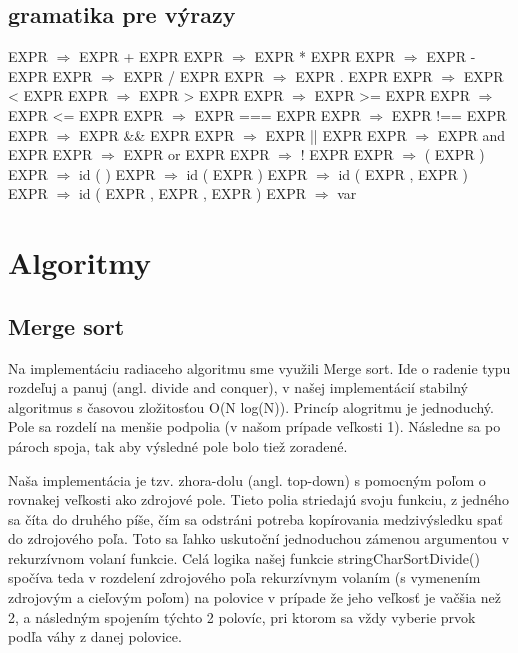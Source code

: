 \documentclass[12pt,a4paper,titlepage,final]{article}
\begin{document}
\subsection{gramatika pre výrazy}

EXPR $\Rightarrow$ EXPR + EXPR
EXPR $\Rightarrow$ EXPR * EXPR
EXPR $\Rightarrow$ EXPR - EXPR
EXPR $\Rightarrow$ EXPR / EXPR
EXPR $\Rightarrow$ EXPR . EXPR
EXPR $\Rightarrow$ EXPR < EXPR
EXPR $\Rightarrow$ EXPR > EXPR
EXPR $\Rightarrow$ EXPR >= EXPR
EXPR $\Rightarrow$ EXPR <= EXPR
EXPR $\Rightarrow$ EXPR === EXPR
EXPR $\Rightarrow$ EXPR !== EXPR
EXPR $\Rightarrow$ EXPR \&\& EXPR
EXPR $\Rightarrow$ EXPR || EXPR
EXPR $\Rightarrow$ EXPR and EXPR
EXPR $\Rightarrow$ EXPR or EXPR
EXPR $\Rightarrow$ ! EXPR
EXPR $\Rightarrow$ ( EXPR )
EXPR $\Rightarrow$ id ( )
EXPR $\Rightarrow$ id ( EXPR )
EXPR $\Rightarrow$ id ( EXPR , EXPR )
EXPR $\Rightarrow$ id ( EXPR , EXPR , EXPR )
EXPR $\Rightarrow$ var
\newpage

\section{Algoritmy} \label{Algoritmy}

\subsection{Merge sort}
Na implementáciu radiaceho algoritmu sme využili Merge sort. Ide o radenie
 typu rozdeľuj a panuj (angl. divide and conquer), v našej implementácií stabilný
 algoritmus s časovou zložitosťou O(N log(N)). Princíp alogritmu je jednoduchý.
 Pole sa rozdelí na menšie podpolia (v našom prípade veľkosti 1). Následne sa
 po pároch spoja, tak aby výsledné pole bolo tiež zoradené.

Naša implementácia je tzv. zhora-dolu (angl. top-down) s pomocným poľom o
 rovnakej veľkosti ako zdrojové pole. Tieto polia striedajú svoju funkciu, z
 jedného sa číta do druhého píše, čím sa odstráni potreba kopírovania
 medzivýsledku spať do zdrojového poľa. Toto sa ľahko uskutoční jednoduchou
 zámenou argumentou v rekurzívnom volaní funkcie. Celá logika našej funkcie
 stringCharSortDivide() spočíva teda v rozdelení zdrojového poľa rekurzívnym
 volaním (s vymenením zdrojovým a cieľovým poľom) na polovice v prípade že jeho
 veľkosť je vačšia než 2, a následným spojením týchto 2 polovíc, pri ktorom sa
 vždy vyberie prvok podľa váhy z danej polovice.
\end{document}
